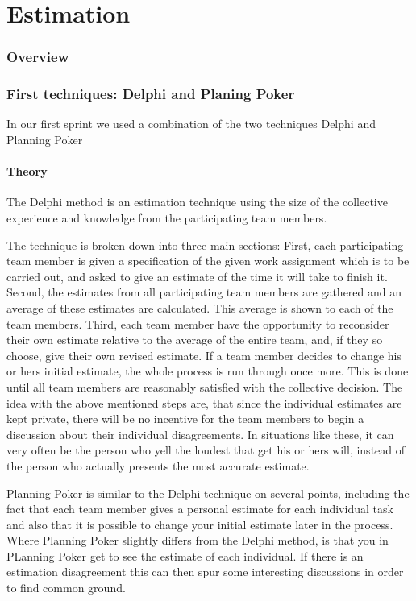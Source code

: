 \part{Estimation}
\section{Overview}
\section{First techniques: Delphi and Planing Poker}
In our first sprint we used a combination of the two techniques Delphi and Planning Poker

\subsection{Theory}


The Delphi method is an estimation technique using the size of the collective experience and knowledge from the participating team members.

The technique is broken down into three main sections:
First, each participating team member is given a specification of the given work assignment which is to be carried out, and asked to give an estimate of the time it will take to finish it.
Second, the estimates from all participating team members are gathered and an average of these estimates are calculated. This average is shown to each of the team members.
Third, each team member have the opportunity to reconsider their own estimate relative to the average of the entire team, and, if they so choose, give their own revised estimate.
If a team member decides to change his or hers initial estimate, the whole process is run through once more. This is done until all team members are reasonably satisfied with the collective decision. 
The idea with the above mentioned steps are, that since the individual estimates are kept private, there will be no incentive for the team members to begin a discussion about their individual disagreements. In situations like these, it can very often be the person who yell the loudest that get his or hers will, instead of the person who actually presents the most accurate estimate.


Planning Poker is similar to the Delphi technique on several points, including the fact that each team member gives a personal estimate for each individual task and also that it is possible to change your initial estimate later in the process. Where Planning Poker slightly differs from the Delphi method, is that you in PLanning Poker get to see the estimate of each individual. If there is an estimation disagreement this can then spur some interesting discussions in order to find common ground. 

